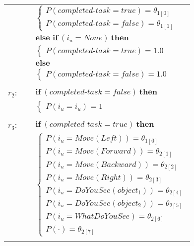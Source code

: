 \begin{small}
\begin{longtable}{p{1cm}p{14cm}}
& \;\;\;\;\; $ \begin{cases}P(\mathit{completed\mbox{-}task}\!=\!\mathit{true})\!=\!\theta_{\mathrm{1[0]}} \\
P(\mathit{completed\mbox{-}task}\!=\!\mathit{false})\!=\!\theta_{\mathrm{1[1]}} \end{cases}$\\ & $ \textbf{else if} \ (\mathit{i_u}\!=\!\mathit{None}) \ \textbf{then}$ \\
& \;\;\;\;\; $ \begin{cases}P(\mathit{completed\mbox{-}task}\!=\!\mathit{true})\!=\!1.0 \end{cases}$\\ & $ \textbf{else}$ \\
& \;\;\;\;\; $ \begin{cases}P(\mathit{completed\mbox{-}task}\!=\!\mathit{false})\!=\!1.0 \end{cases}$ \\ \\[-2mm]
$r_{2}$: \ \ & $ \textbf{if} \ (\mathit{completed\mbox{-}task}\!=\!\mathit{false}) \ \textbf{then} $ \\
 & \;\;\;\;\; $ \begin{cases}P(\mathit{i_u}\!=\!\mathit{{i_u}})\!=\!1 \end{cases}$ \\ \\[-2mm]
$r_{3}$: \ \ & $ \textbf{if} \ (\mathit{completed\mbox{-}task}\!=\!\mathit{true}) \ \textbf{then} $ \\
 & \;\;\;\;\; $ \begin{cases}P(\mathit{i_u}\!=\!\mathit{Move(Left)})\!=\!\theta_{\mathrm{1[0]}} \\
P(\mathit{i_u}\!=\!\mathit{Move(Forward)})\!=\!\theta_{\mathrm{2[1]}} \\
P(\mathit{i_u}\!=\!\mathit{Move(Backward)})\!=\!\theta_{\mathrm{2[2]}} \\
P(\mathit{i_u}\!=\!\mathit{Move(Right)})\!=\!\theta_{\mathrm{2[3]}} \\
P(\mathit{i_u}\!=\!\mathit{DoYouSee(object_1)})\!=\!\theta_{\mathrm{2[4]}} \\
P(\mathit{i_u}\!=\!\mathit{DoYouSee(object_2)})\!=\!\theta_{\mathrm{2[5]}} \\
P(\mathit{i_u}\!=\!\mathit{WhatDoYouSee})\!=\!\theta_{\mathrm{2[6]}} \\
P(\cdot)\!=\!\theta_{\mathrm{2[7]}} \end{cases}$ \\ \\[-2mm]

\end{longtable}
\end{small}
